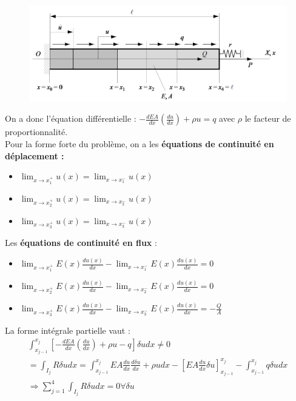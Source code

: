 \documentclass[../main.tex]{subfiles}
\begin{document}
\begin{figure}[hbt!]
    \centering
    \includegraphics[width=.7\textwidth]{IMAGES/elementfinis/ef1.png}
\end{figure}

On a donc l'équation différentielle : $-\frac{dEA}{dx}(\frac{du}{dx}) + \rho u = q$ avec $\rho$ le facteur de proportionnalité.\\
Pour la forme forte du problème, on a les \textbf{équations de continuité en déplacement :} \begin{itemize}
    \item $\lim_{x\rightarrow x_1^+} u(x) = \lim_{x\rightarrow x_1^-} u(x)$\\
    \item $\lim_{x\rightarrow x_2^+} u(x) = \lim_{x\rightarrow x_2^-} u(x)$\\
    \item $\lim_{x\rightarrow x_3^+} u(x) = \lim_{x\rightarrow x_3^-} u(x)$\\
\end{itemize}

Les \textbf{équations de continuité en flux} : \begin{itemize}
    \item $\lim_{x\rightarrow x_1^+} E(x) \frac{du(x)}{dx} - \lim_{x\rightarrow x_1^-} E(x) \frac{du(x)}{dx} = 0$\\
    \item $\lim_{x\rightarrow x_2^+} E(x) \frac{du(x)}{dx} - \lim_{x\rightarrow x_2^-} E(x) \frac{du(x)}{dx} = 0$\\
    \item $\lim_{x\rightarrow x_3^+} E(x) \frac{du(x)}{dx} - \lim_{x\rightarrow x_3^-} E(x) \frac{du(x)}{dx} = -\frac{Q}{A}$\\
\end{itemize}

La forme intégrale partielle vaut : \begin{equation}\begin{gathered}
    \int_{x_{j-1}}^{x_j} [-\frac{dEA}{dx}(\frac{du}{dx}) + \rho u-q]\delta u dx \neq 0\\
    = \int_{I_j} R\delta u dx = \int_{x_{j-1}}^{x_j} EA \frac{du}{dx} \frac{d\delta u}{dx} + \rho u dx - [EA \frac{du}{dx} \delta u]_{x_{j-1}}^{x_j} - \int_{x_{j-1}}^{x_j} q\delta udx\\
    \Rightarrow \sum_{j=1}^4 \int_{I_j} R\delta udx = 0 \forall \delta u\\
    \end{gathered}
\end{equation}
\end{document}
